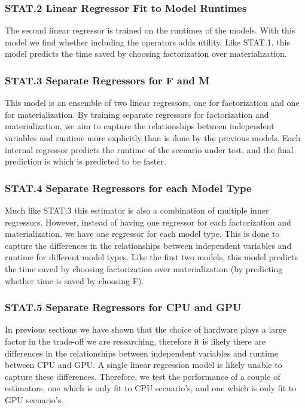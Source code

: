\subsubsection*{STAT.2 Linear Regressor Fit to Model Runtimes}
The second linear regressor is trained on the runtimes of the models. With this model we find whether including the operators adds utility. Like STAT.1, this model predicts the time saved by choosing factorization over materialization.

\subsubsection*{STAT.3 Separate Regressors for F and M}
This model is an ensemble of two linear regressors, one for factorization and one for materialization. By training separate regressors for factorization and materialization, we aim to capture the relationships between independent variables and runtime more explicitly than is done by the previous models. Each internal regressor predicts the runtime of the scenario under test, and the final prediction is which is predicted to be faster.

\subsubsection*{STAT.4 Separate Regressors for each Model Type}
Much like STAT.3 this estimator is also a combination of multiple inner regressors. However, instead of having one regressor for each factorization and materialization, we have one regressor for each model type. This is done to capture the differences in the relationships between independent variables and runtime for different model types. Like the first two models, this model predicts the time saved by choosing factorization over materialization (by predicting whether time is saved by choosing F).

\subsubsection*{STAT.5 Separate Regressors for CPU and GPU}
In previous sections we have shown that the choice of hardware plays a large factor in the trade-off we are researching, therefore it is likely there are differences in the relationships between independent variables and runtime between CPU and GPU. A single linear regression model is likely unable to capture these differences. Therefore, we test the performance of a couple of estimators, one which is only fit to CPU scenario's, and one which is only fit to GPU scenario's.

